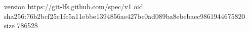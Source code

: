 version https://git-lfs.github.com/spec/v1
oid sha256:76b2bcf25c1fc5a11ebbe1394856ae427be0ad089ba8ebebaec9861944675820
size 786528
